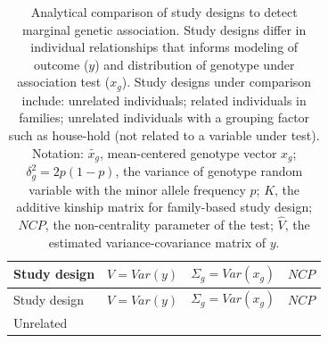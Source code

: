 \documentclass[]{book}
\theoremstyle{definition}
\theoremstyle{definition}
\theoremstyle{definition}
\theoremstyle{remark}
\begin{document}
\begin{longtable}[]{@{}llll@{}}
\caption{\label{tab:assoc-gen} Analytical comparison of study designs to
detect marginal genetic association. Study designs differ in individual
relationships that informs modeling of outcome (\(y\)) and distribution
of genotype under association test (\(x_g\)). Study designs under
comparison include: unrelated individuals; related individuals in
families; unrelated individuals with a grouping factor such as
house-hold (not related to a variable under test). Notation:
\(\tilde{x_g}\), mean-centered genotype vector \(x_g\);
\(\delta_g^2 = 2 p (1 - p)\), the variance of genotype random variable
with the minor allele frequency \(p\); \(K\), the additive kinship
matrix for family-based study design; \(NCP\), the non-centrality
parameter of the test; \(\hat{V}\), the estimated variance-covariance
matrix of \(y\).}\tabularnewline
\toprule
\begin{minipage}[b]{0.21\columnwidth}\raggedright\strut
Study design\strut
\end{minipage} & \begin{minipage}[b]{0.15\columnwidth}\raggedright\strut
\(V = Var(y)\)\strut
\end{minipage} & \begin{minipage}[b]{0.16\columnwidth}\raggedright\strut
\(\Sigma_g = Var(x_g)\)\strut
\end{minipage} & \begin{minipage}[b]{0.37\columnwidth}\raggedright\strut
\(NCP\)\strut
\end{minipage}\tabularnewline
\midrule
\endfirsthead
\toprule
\begin{minipage}[b]{0.21\columnwidth}\raggedright\strut
Study design\strut
\end{minipage} & \begin{minipage}[b]{0.15\columnwidth}\raggedright\strut
\(V = Var(y)\)\strut
\end{minipage} & \begin{minipage}[b]{0.16\columnwidth}\raggedright\strut
\(\Sigma_g = Var(x_g)\)\strut
\end{minipage} & \begin{minipage}[b]{0.37\columnwidth}\raggedright\strut
\(NCP\)\strut
\end{minipage}\tabularnewline
\midrule
\endhead
\begin{minipage}[t]{0.21\columnwidth}\raggedright\strut
Unrelated\strut
\end{minipage} & \begin{minipage}[t]{0.15\columnwidth}\raggedright\strut

\end{minipage}
\end{longtable}
\end{document}
